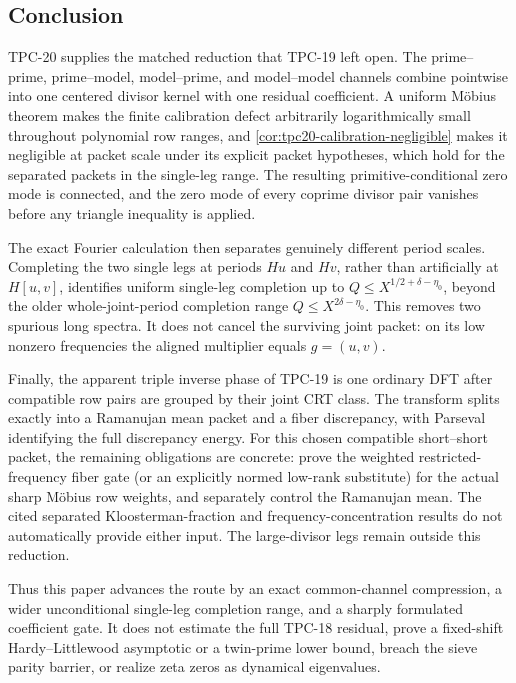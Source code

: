 \subsection{Conclusion}

TPC-20 supplies the matched reduction that TPC-19 left open.  The
prime--prime, prime--model, model--prime, and model--model channels combine
pointwise into one centered divisor kernel with one residual
coefficient.  A uniform M\"obius theorem makes the finite calibration
defect arbitrarily logarithmically small throughout polynomial row
ranges, and \cref{cor:tpc20-calibration-negligible} makes it negligible
at packet scale under its explicit packet hypotheses, which hold for the
separated packets in the single-leg range.  The resulting
primitive-conditional zero mode is connected, and the zero mode of
every coprime divisor pair vanishes before any triangle inequality is
applied.

The exact Fourier calculation then separates genuinely different
period scales.  Completing the two single legs at periods \(Hu\) and
\(Hv\), rather than artificially at \(H[u,v]\), identifies uniform
single-leg completion up to
\(Q\le X^{1/2+\delta-\eta_0}\), beyond the older whole-joint-period
completion range \(Q\le X^{2\delta-\eta_0}\).  This removes two spurious long
spectra.  It does not cancel the surviving joint packet: on its low
nonzero frequencies the aligned multiplier equals \(g=(u,v)\).

Finally, the apparent triple inverse phase of TPC-19 is one ordinary
DFT after compatible row pairs are grouped by their joint CRT class.
The transform splits exactly into a Ramanujan mean packet and a fiber
discrepancy, with Parseval identifying the full discrepancy energy.
For this chosen compatible short--short packet, the remaining
obligations are concrete: prove the weighted restricted-frequency fiber
gate (or an explicitly normed low-rank substitute) for the actual sharp
M\"obius row weights, and separately control the Ramanujan mean.  The
cited separated Kloosterman-fraction and frequency-concentration
results do not automatically provide either input.  The large-divisor
legs remain outside this reduction.

Thus this paper advances the route by an exact common-channel
compression, a wider unconditional single-leg completion range, and a
sharply formulated coefficient gate.  It does not estimate the full TPC-18
residual, prove a fixed-shift Hardy--Littlewood asymptotic or a
twin-prime lower bound, breach the sieve parity barrier, or realize
zeta zeros as dynamical eigenvalues.
